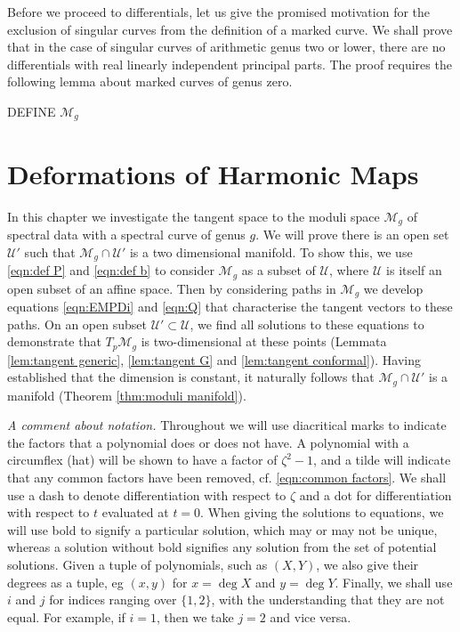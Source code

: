 \documentclass{article}
\begin{document}

Before we proceed to differentials, let us give the promised motivation for the exclusion of singular curves from the definition of a marked curve. We shall prove that in the case of singular curves of arithmetic genus two or lower, there are no differentials with real linearly independent principal parts. The proof requires the following lemma about marked curves of genus zero.


\todo{}DEFINE $\mathcal{M}_g$





\section{Deformations of Harmonic Maps}
In this chapter we investigate the tangent space to the moduli space $\mathcal{M}_g$ of spectral data with a spectral curve of genus $g$. We will prove there is an open set $\mathcal{U}'$ such that $\mathcal{M}_g \cap \mathcal{U}'$ is a two dimensional manifold. To show this, we use \eqref{eqn:def P} and \eqref{eqn:def b} to consider $\mathcal{M}_g$ as a subset of $\mathcal{U}$, where $\mathcal{U}$ is itself an open subset of an affine space. Then by considering paths in $\mathcal{M}_g$ we develop equations \eqref{eqn:EMPDi} and \eqref{eqn:Q} that characterise the tangent vectors to these paths. On an open subset $\mathcal{U}' \subset \mathcal{U}$, we find all solutions to these equations to demonstrate that $T_p\mathcal{M}_g$ is two-dimensional at these points (Lemmata \ref{lem:tangent generic}, \ref{lem:tangent G} and \ref{lem:tangent conformal}). Having established that the dimension is constant, it naturally follows that $\mathcal{M}_g\cap \mathcal{U}'$ is a manifold (Theorem \ref{thm:moduli manifold}).

\emph{A comment about notation.} Throughout we will use diacritical marks to indicate the factors that a polynomial does or does not have. A polynomial with a circumflex (hat) will be shown to have a factor of $\zeta^2-1$, and a tilde will indicate that any common factors have been removed, cf. \eqref{eqn:common factors}. We shall use a dash to denote differentiation with respect to $\zeta$ and a dot for differentiation with respect to $t$ evaluated at $t=0$.
When giving the solutions to equations, we will use bold to signify a particular solution, which may or may not be unique, whereas a solution without bold signifies any solution from the set of potential solutions. Given a tuple of polynomials, such as $(X,Y)$, we also give their degrees as a tuple, eg $(x,y)$ for $x=\deg X$ and $y=\deg Y$. Finally, we shall use $i$ and $j$ for indices ranging over $\{1,2\}$, with the understanding that they are not equal. For example, if $i=1$, then we take $j=2$ and vice versa.
\end{document}
